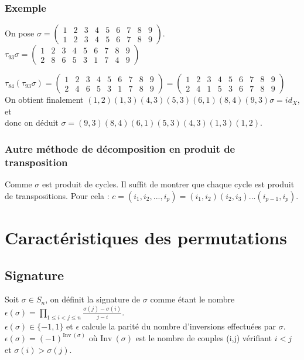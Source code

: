 \documentclass[a4paper,10pt]{book} %
\newcommand{\Inv}{\mathrm{Inv}~} %
\begin{document}
\subsubsection{Exemple}
On pose $\sigma=\begin{pmatrix}
1&2&3&4&5&6&7&8&9\\1&2&3&4&5&6&7&8&9
\end{pmatrix}$.
$\tau_{93}\sigma=\begin{pmatrix}
1&2&3&4&5&6&7&8&9\\2&8&6&5&3&1&7&4&9
\end{pmatrix}$

$\tau_{84}(\tau_{93}\sigma)=\begin{pmatrix}
1&2&3&4&5&6&7&8&9\\ 2&4&6&5&3&1&7&8&9
\end{pmatrix}=\begin{pmatrix}
1&2&3&4&5&6&7&8&9\\2&4&1&5&3&6&7&8&9
\end{pmatrix}$\\

On obtient finalement $(1,2)(1,3)(4,3)(5,3)(6,1)(8,4)(9,3) \sigma=id_X$, et \\donc on déduit $\sigma=(9,3)(8,4)(6,1)(5,3)(4,3)(1,3)(1,2)$.

\subsubsection{Autre méthode de décomposition en produit de transposition}
Comme $\sigma$ est produit de cycles. Il suffit de montrer que chaque cycle est produit de transpositions. Pour cela : $c=(i_1,i_2,...,i_p)=(i_1,i_2)(i_2,i_3)...(i_{p-1},i_p)$.

\newpage

\section{Caractéristiques des permutations}
\subsection{Signature}
Soit $\sigma\in S_n$, on définit la signature de $\sigma$ comme étant le nombre $\epsilon(\sigma)=\prod_{1\leq i<j\leq n} \frac{\sigma(j)-\sigma(i)}{j-i}$.\\
$\epsilon(\sigma)\in\{-1,1\}$ et $\epsilon$ calcule la parité du nombre d'inversions effectuées par $\sigma$. $\epsilon(\sigma)=(-1)^{\Inv(\sigma)}$ où $\Inv(\sigma)$ est le nombre de couples (i,j) vérifiant $i<j$ et $\sigma(i)>\sigma(j)$.
\end{document}
